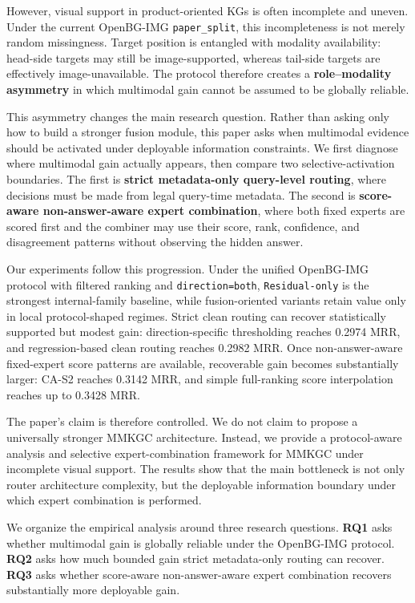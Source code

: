\documentclass[11pt]{article}
\begin{document}
However, visual support in product-oriented KGs is often incomplete and uneven. Under the current OpenBG-IMG \texttt{paper\_split}, this incompleteness is not merely random missingness. Target position is entangled with modality availability: head-side targets may still be image-supported, whereas tail-side targets are effectively image-unavailable. The protocol therefore creates a \textbf{role--modality asymmetry} in which multimodal gain cannot be assumed to be globally reliable.

This asymmetry changes the main research question. Rather than asking only how to build a stronger fusion module, this paper asks when multimodal evidence should be activated under deployable information constraints. We first diagnose where multimodal gain actually appears, then compare two selective-activation boundaries. The first is \textbf{strict metadata-only query-level routing}, where decisions must be made from legal query-time metadata. The second is \textbf{score-aware non-answer-aware expert combination}, where both fixed experts are scored first and the combiner may use their score, rank, confidence, and disagreement patterns without observing the hidden answer.

Our experiments follow this progression. Under the unified OpenBG-IMG protocol with filtered ranking and \texttt{direction=both}, \texttt{Residual-only} is the strongest internal-family baseline, while fusion-oriented variants retain value only in local protocol-shaped regimes. Strict clean routing can recover statistically supported but modest gain: direction-specific thresholding reaches 0.2974 MRR, and regression-based clean routing reaches 0.2982 MRR. Once non-answer-aware fixed-expert score patterns are available, recoverable gain becomes substantially larger: CA-S2 reaches 0.3142 MRR, and simple full-ranking score interpolation reaches up to 0.3428 MRR.

The paper's claim is therefore controlled. We do not claim to propose a universally stronger MMKGC architecture. Instead, we provide a protocol-aware analysis and selective expert-combination framework for MMKGC under incomplete visual support. The results show that the main bottleneck is not only router architecture complexity, but the deployable information boundary under which expert combination is performed.

We organize the empirical analysis around three research questions. \textbf{RQ1} asks whether multimodal gain is globally reliable under the OpenBG-IMG protocol. \textbf{RQ2} asks how much bounded gain strict metadata-only routing can recover. \textbf{RQ3} asks whether score-aware non-answer-aware expert combination recovers substantially more deployable gain.
\end{document}
